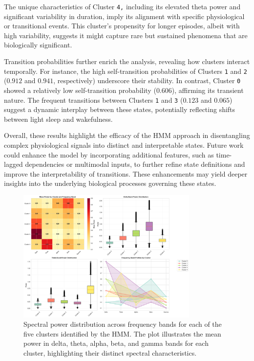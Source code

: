 \documentclass[a4paper,12pt,twoside]{article}
\begin{document}
The unique characteristics of Cluster \texttt{4,} including its elevated theta power and significant variability in duration, imply its alignment with specific physiological or transitional events. This cluster's propensity for longer episodes, albeit with high variability, suggests it might capture rare but sustained phenomena that are biologically significant.

Transition probabilities further enrich the analysis, revealing how clusters interact temporally. For instance, the high self-transition probabilities of Clusters \texttt{1} and \texttt{2} (\(0.912\) and \(0.941\), respectively) underscore their stability. In contrast, Cluster \texttt{0} showed a relatively low self-transition probability (\(0.606\)), affirming its transient nature. The frequent transitions between Clusters \texttt{1} and \texttt{3} (\(0.123\) and \(0.065\)) suggest a dynamic interplay between these states, potentially reflecting shifts between light sleep and wakefulness.

Overall, these results highlight the efficacy of the HMM approach in disentangling complex physiological signals into distinct and interpretable states. Future work could enhance the model by incorporating additional features, such as time-lagged dependencies or multimodal inputs, to further refine state definitions and improve the interpretability of transitions. These enhancements may yield deeper insights into the underlying biological processes governing these states.


\begin{figure}[H]
    \centering
    \includegraphics[width=0.8\textwidth]{img/HMM power bands.png}
    \caption{Spectral power distribution across frequency bands for each of the five clusters identified by the HMM. The plot illustrates the mean power in delta, theta, alpha, beta, and gamma bands for each cluster, highlighting their distinct spectral characteristics.}
    \label{fig:hmm_clusters_spectral}
\end{figure}
\end{document}

